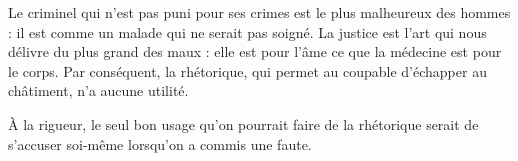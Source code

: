 
Le criminel qui n'est pas puni pour ses crimes est le plus malheureux des hommes : il est comme un malade qui ne serait pas soigné. La justice est l'art qui nous délivre du plus grand des maux : elle est pour l'âme ce que la médecine est pour le corps. Par conséquent, la rhétorique, qui permet au coupable d'échapper au châtiment, n'a aucune utilité.

À la rigueur, le seul bon usage qu'on pourrait faire de la rhétorique serait de s'accuser soi-même lorsqu'on a commis une faute.
